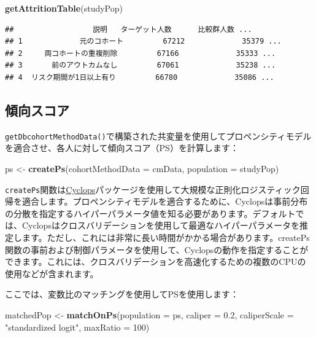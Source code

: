 \documentclass[
  11pt]{book}
\newenvironment{Shaded}{\begin{snugshade}}{\end{snugshade}}
\newcommand{\AttributeTok}[1]{\textcolor[rgb]{0.13,0.29,0.53}{#1}}
\newcommand{\DecValTok}[1]{\textcolor[rgb]{0.00,0.00,0.81}{#1}}
\newcommand{\FloatTok}[1]{\textcolor[rgb]{0.00,0.00,0.81}{#1}}
\newcommand{\FunctionTok}[1]{\textcolor[rgb]{0.13,0.29,0.53}{\textbf{#1}}}
\newcommand{\NormalTok}[1]{#1}
\newcommand{\OtherTok}[1]{\textcolor[rgb]{0.56,0.35,0.01}{#1}}
\newcommand{\StringTok}[1]{\textcolor[rgb]{0.31,0.60,0.02}{#1}}
\theoremstyle{definition}
\theoremstyle{definition}
\theoremstyle{definition}
\theoremstyle{definition}
\theoremstyle{remark}
\begin{document}
\begin{Shaded}
\begin{Highlighting}[]
\FunctionTok{getAttritionTable}\NormalTok{(studyPop)}
\end{Highlighting}
\end{Shaded}

\begin{verbatim}
##                  説明   ターゲット人数 　　　比較群人数 ...
## 1             元のコホート         67212             35379 ...
## 2     両コホートの重複削除         67166             35333 ...
## 3     　前のアウトカムなし         67061             35238 ...
## 4  リスク期間が1日以上有り         66780             35086 ...
\end{verbatim}

\subsection{傾向スコア}\label{ux50beux5411ux30b9ux30b3ux30a2-1}

\texttt{getDbcohortMethodData()}で構築された共変量を使用してプロペンシティモデルを適合させ、各人に対して傾向スコア（PS）を計算します：

\begin{Shaded}
\begin{Highlighting}[]
\NormalTok{ps }\OtherTok{\textless{}{-}} \FunctionTok{createPs}\NormalTok{(}\AttributeTok{cohortMethodData =}\NormalTok{ cmData, }\AttributeTok{population =}\NormalTok{ studyPop)}
\end{Highlighting}
\end{Shaded}

\texttt{createPs}関数は\href{https://ohdsi.github.io/Cyclops/}{Cyclops}パッケージを使用して大規模な正則化ロジスティック回帰を適合します。プロペンシティモデルを適合するために、Cyclopsは事前分布の分散を指定するハイパーパラメータ値を知る必要があります。デフォルトでは、Cyclopsはクロスバリデーションを使用して最適なハイパーパラメータを推定します。ただし、これには非常に長い時間がかかる場合があります。createPs関数の事前および制御パラメータを使用して、Cyclopsの動作を指定することができます。これには、クロスバリデーションを高速化するための複数のCPUの使用などが含まれます。

ここでは、変数比のマッチングを使用してPSを使用します：

\begin{Shaded}
\begin{Highlighting}[]
\NormalTok{matchedPop }\OtherTok{\textless{}{-}} \FunctionTok{matchOnPs}\NormalTok{(}\AttributeTok{population =}\NormalTok{ ps, }\AttributeTok{caliper =} \FloatTok{0.2}\NormalTok{,}
                        \AttributeTok{caliperScale =} \StringTok{"standardized logit"}\NormalTok{, }\AttributeTok{maxRatio =} \DecValTok{100}\NormalTok{)}
\end{Highlighting}
\end{Shaded}
\end{document}
